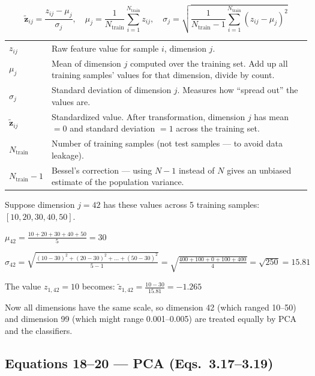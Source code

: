 \documentclass[12pt, a4paper]{article}
\begin{document}
\begin{eqbox}
\[
\tilde{\mathbf{z}}_{ij} = \frac{z_{ij} - \mu_j}{\sigma_j}, \quad \mu_j = \frac{1}{N_{\text{train}}} \sum_{i=1}^{N_{\text{train}}} z_{ij}, \quad \sigma_j = \sqrt{\frac{1}{N_{\text{train}}-1} \sum_{i=1}^{N_{\text{train}}} (z_{ij} - \mu_j)^2}
\]
\end{eqbox}

\begin{explainbox}
\begin{tabular}{lp{11cm}}
$z_{ij}$ & Raw feature value for sample $i$, dimension $j$.\\[0.2cm]
$\mu_j$ & Mean of dimension $j$ computed over the training set. Add up all training samples' values for that dimension, divide by count.\\[0.2cm]
$\sigma_j$ & Standard deviation of dimension $j$. Measures how ``spread out'' the values are.\\[0.2cm]
$\tilde{\mathbf{z}}_{ij}$ & Standardized value. After transformation, dimension $j$ has mean $= 0$ and standard deviation $= 1$ across the training set.\\[0.2cm]
$N_{\text{train}}$ & Number of training samples (not test samples --- to avoid data leakage).\\[0.2cm]
$N_{\text{train}} - 1$ & Bessel's correction --- using $N-1$ instead of $N$ gives an unbiased estimate of the population variance.
\end{tabular}
\end{explainbox}

\begin{examplebox}
Suppose dimension $j = 42$ has these values across 5 training samples: $[10, 20, 30, 40, 50]$.

$\mu_{42} = \frac{10+20+30+40+50}{5} = 30$

$\sigma_{42} = \sqrt{\frac{(10-30)^2 + (20-30)^2 + \ldots + (50-30)^2}{5-1}} = \sqrt{\frac{400+100+0+100+400}{4}} = \sqrt{250} = 15.81$

The value $z_{1,42} = 10$ becomes: $\tilde{z}_{1,42} = \frac{10 - 30}{15.81} = -1.265$

Now all dimensions have the same scale, so dimension 42 (which ranged 10--50) and dimension 99 (which might range 0.001--0.005) are treated equally by PCA and the classifiers.
\end{examplebox}


\subsection{Equations 18--20 --- PCA (Eqs.~3.17--3.19)}
\end{document}
